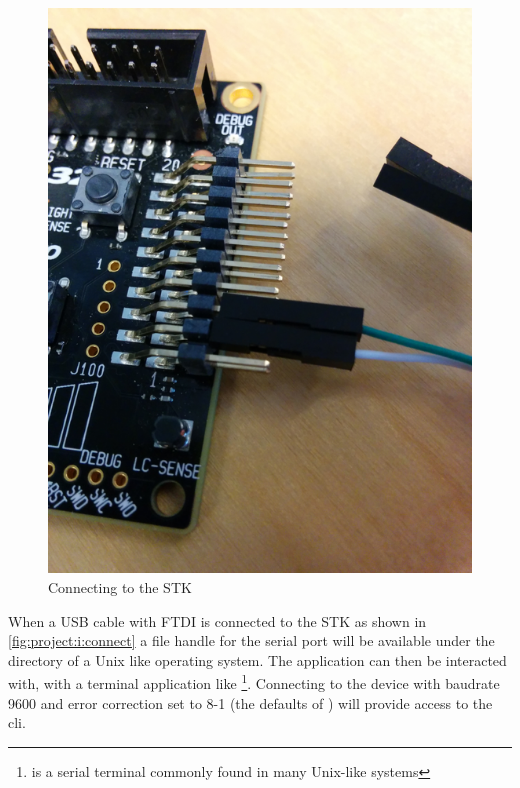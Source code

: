 \begin{figure}[H]
  \begin{center}
    \includegraphics[scale=0.3]{figures/project-i-connect.png}
  \end{center}
  \caption{Connecting to the STK}
  \label{fig:project:i:connect}
\end{figure}

When a USB cable with FTDI is connected to the STK as shown in \autoref{fig:project:i:connect} a file handle for the serial port will be available under the  directory of a Unix like operating system.
The application can then be interacted with, with a terminal application like \footnote{ is a serial terminal commonly found in many Unix-like systems}.
Connecting to the device with baudrate 9600 and error correction set to 8-1 (the defaults of ) will provide access to the {\tracker} \gls{cli}.

